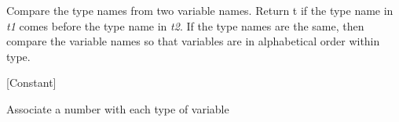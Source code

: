 \begin{doc-string}
Compare the type names from two variable names.  Return t if the type
name in \emph{t1} comes before the type name in \emph{t2}.  If the type names are the same,
then compare the variable names so that variables are in alphabetical order
within type.
\end{doc-string}

\vspace{1em}
\noindent
{}
\usebox{\funcname}
 \hfill [Constant]

\begin{doc-string}
Associate a number with each type of variable
\end{doc-string}
